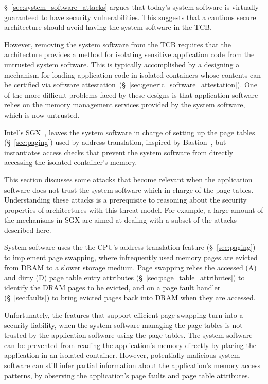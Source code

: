 \label{sec:address_translation_attacks}

\S~\ref{sec:system_software_attacks} argues that today's system software is
virtually guaranteed to have security vulnerabilities. This suggests that a
cautious secure architecture should avoid having the system software in the
TCB.

However, removing the system software from the TCB requires that the
architecture provides a method for isolating sensitive application code from
the untrusted system software. This is typically accomplished by a designing a
mechanism for loading application code in isolated containers whose contents
can be certified via software
attestation~(\S~\ref{sec:generic_software_attestation}). One of the more
difficult problems faced by these designs is that application software relies
on the memory management services provided by the system software, which is now
untrusted.

Intel's SGX~\cite{mckeen2013sgx, anati2013sgx}, leaves the system software in charge of
setting up the page tables (\S~\ref{sec:paging}) used by address translation, inspired by Bastion~\cite{champagne2010bastion},
but instantiates access checks that prevent the system software from directly
accessing the isolated container's memory.

This section discusses some attacks that become relevant when the application
software does not trust the system software which in charge of the page tables.
Understanding these attacks is a prerequisite to reasoning about the security
properties of architectures with this threat model. For example, a large amount
of the mechanisms in SGX are aimed at dealing with a subset of the attacks
described here.


\label{sec:fault_tracking_attacks}

System software uses the the CPU's address translation feature
(\S~\ref{sec:paging}) to implement page swapping, where infrequently used
memory pages are evicted from DRAM to a slower storage medium. Page swapping
relies the accessed (A) and dirty (D) page table entry attributes
(\S~\ref{sec:page_table_attributes}) to identify the DRAM pages to be evicted,
and on a page fault handler (\S~\ref{sec:faults}) to bring evicted pages back
into DRAM when they are accessed.

Unfortunately, the features that support efficient page swapping turn into a
security liability, when the system software managing the page tables is not
trusted by the application software using the page tables. The system software
can be prevented from reading the application's memory directly by placing the
application in an isolated container. However, potentially malicious system
software can still infer partial information about the application's memory
access patterns, by observing the application's page faults and page table
attributes.

